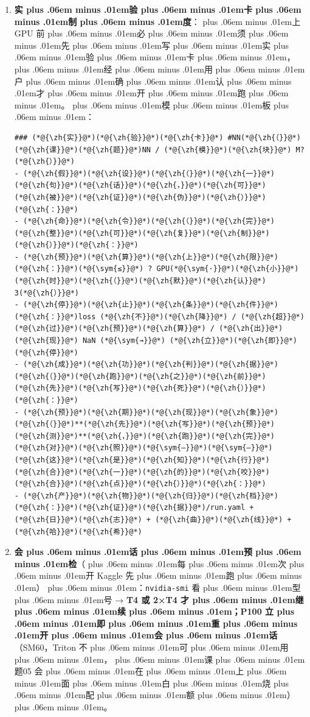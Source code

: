 \documentclass[
]{article}
\newcommand{\passthrough}[1]{#1}
\def\zh#1{{\zhfont #1}}
\def\sym#1{{\symfont #1}}
\def\zhglue{\hskip0pt plus .06em minus .01em}
\begin{document}
\begin{enumerate}
\def\labelenumi{\arabic{enumi}.}
\item
  \textbf{\zh{实\zhglue 验\zhglue 卡\zhglue 制\zhglue 度}}\zh{：\zhglue 上} GPU \zh{前\zhglue 必\zhglue 须\zhglue 先\zhglue 写\zhglue 实\zhglue 验\zhglue 卡\zhglue ，\zhglue 经\zhglue 用\zhglue 户\zhglue 确\zhglue 认\zhglue 才\zhglue 开\zhglue 跑\zhglue 。\zhglue 模\zhglue 板\zhglue ：}

\begin{lstlisting}
### (*@{\zh{实}}@*)(*@{\zh{验}}@*)(*@{\zh{卡}}@*) #NN(*@{\zh{（}}@*)(*@{\zh{课}}@*)(*@{\zh{题}}@*)NN / (*@{\zh{模}}@*)(*@{\zh{块}}@*) M?(*@{\zh{）}}@*)
- (*@{\zh{假}}@*)(*@{\zh{设}}@*)(*@{\zh{（}}@*)(*@{\zh{一}}@*)(*@{\zh{句}}@*)(*@{\zh{话}}@*)(*@{\zh{，}}@*)(*@{\zh{可}}@*)(*@{\zh{被}}@*)(*@{\zh{证}}@*)(*@{\zh{伪}}@*)(*@{\zh{）}}@*)(*@{\zh{：}}@*)
- (*@{\zh{命}}@*)(*@{\zh{令}}@*)(*@{\zh{（}}@*)(*@{\zh{完}}@*)(*@{\zh{整}}@*)(*@{\zh{可}}@*)(*@{\zh{复}}@*)(*@{\zh{制}}@*)(*@{\zh{）}}@*)(*@{\zh{：}}@*)
- (*@{\zh{预}}@*)(*@{\zh{算}}@*)(*@{\zh{上}}@*)(*@{\zh{限}}@*)(*@{\zh{：}}@*)(*@{\sym{≤}}@*) ? GPU(*@{\sym{·}}@*)(*@{\zh{小}}@*)(*@{\zh{时}}@*)(*@{\zh{（}}@*)(*@{\zh{默}}@*)(*@{\zh{认}}@*) 3(*@{\zh{）}}@*)
- (*@{\zh{停}}@*)(*@{\zh{止}}@*)(*@{\zh{条}}@*)(*@{\zh{件}}@*)(*@{\zh{：}}@*)loss (*@{\zh{不}}@*)(*@{\zh{降}}@*) / (*@{\zh{超}}@*)(*@{\zh{过}}@*)(*@{\zh{预}}@*)(*@{\zh{算}}@*) / (*@{\zh{出}}@*)(*@{\zh{现}}@*) NaN (*@{\sym{→}}@*) (*@{\zh{立}}@*)(*@{\zh{即}}@*)(*@{\zh{停}}@*)
- (*@{\zh{成}}@*)(*@{\zh{功}}@*)(*@{\zh{判}}@*)(*@{\zh{据}}@*)(*@{\zh{（}}@*)(*@{\zh{跑}}@*)(*@{\zh{之}}@*)(*@{\zh{前}}@*)(*@{\zh{先}}@*)(*@{\zh{写}}@*)(*@{\zh{死}}@*)(*@{\zh{）}}@*)(*@{\zh{：}}@*)
- (*@{\zh{预}}@*)(*@{\zh{期}}@*)(*@{\zh{现}}@*)(*@{\zh{象}}@*)(*@{\zh{（}}@*)**(*@{\zh{先}}@*)(*@{\zh{写}}@*)(*@{\zh{预}}@*)(*@{\zh{测}}@*)**(*@{\zh{，}}@*)(*@{\zh{跑}}@*)(*@{\zh{完}}@*)(*@{\zh{对}}@*)(*@{\zh{照}}@*)(*@{\sym{—}}@*)(*@{\sym{—}}@*)(*@{\zh{这}}@*)(*@{\zh{是}}@*)(*@{\zh{知}}@*)(*@{\zh{行}}@*)(*@{\zh{合}}@*)(*@{\zh{一}}@*)(*@{\zh{的}}@*)(*@{\zh{咬}}@*)(*@{\zh{合}}@*)(*@{\zh{点}}@*)(*@{\zh{）}}@*)(*@{\zh{：}}@*)
- (*@{\zh{产}}@*)(*@{\zh{物}}@*)(*@{\zh{归}}@*)(*@{\zh{档}}@*)(*@{\zh{：}}@*)(*@{\zh{证}}@*)(*@{\zh{据}}@*)/run.yaml + (*@{\zh{日}}@*)(*@{\zh{志}}@*) + (*@{\zh{曲}}@*)(*@{\zh{线}}@*) + (*@{\zh{哈}}@*)(*@{\zh{希}}@*)
\end{lstlisting}
\item
  \textbf{\zh{会\zhglue 话\zhglue 预\zhglue 检}}\zh{（\zhglue 每\zhglue 次\zhglue 开} Kaggle \zh{先\zhglue 跑\zhglue ）\zhglue ：}\passthrough{\lstinline!nvidia-smi!} \zh{看\zhglue 型\zhglue 号} \sym{→} \textbf{T4 \zh{或} 2\sym{×}T4 \zh{才\zhglue 继\zhglue 续\zhglue ；}P100 \zh{立\zhglue 即\zhglue 重\zhglue 开\zhglue 会\zhglue 话}}\zh{（}SM60\zh{，}Triton \zh{不\zhglue 可\zhglue 用\zhglue ，\zhglue 课\zhglue 题}05 \zh{会\zhglue 在\zhglue 上\zhglue 面\zhglue 白\zhglue 烧\zhglue 配\zhglue 额\zhglue ）\zhglue 。}

\end{enumerate}
\end{document}
